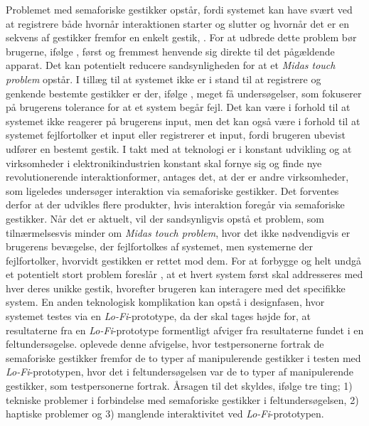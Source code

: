 Problemet med semaforiske gestikker opstår, fordi systemet kan have svært ved at registrere både hvornår interaktionen starter og slutter og hvornår det er en sekvens af gestikker fremfor en enkelt gestik, \parencite[s. 27]{PDF:ATaxonomyOfGestures}. For at udbrede dette problem bør brugerne, ifølge \textcite[s. 1]{PDF:DoThatThere}, først og fremmest henvende sig direkte til det pågældende apparat. Det kan potentielt reducere sandsynligheden for at et \textit{Midas touch problem} opstår. I tillæg til at systemet ikke er i stand til at registrere og genkende bestemte gestikker er der, ifølge \textcite[s. 37]{PDF:ATaxonomyOfGestures}, meget få undersøgelser, som fokuserer på brugerens tolerance for at et system begår fejl. Det kan være i forhold til at systemet ikke reagerer på brugerens input, men det kan også være i forhold til at systemet fejlfortolker et input eller registrerer et input, fordi brugeren ubevist udfører en bestemt gestik. \blankline
%
I takt med at teknologi er i konstant udvikling og at virksomheder i elektronikindustrien konstant skal fornye sig og finde nye revolutionerende interaktionformer, antages det, at der er andre virksomheder, som ligeledes undersøger interaktion via semaforiske gestikker. Det forventes derfor at der udvikles flere produkter, hvis interaktion foregår via semaforiske gestikker. Når det er aktuelt, vil der sandsynligvis opstå et problem, som tilnærmelsesvis minder om \textit{Midas touch problem}, hvor det ikke nødvendigvis er brugerens bevægelse, der fejlfortolkes af systemet, men systemerne der fejlfortolker, hvorvidt gestikken er rettet mod dem. For at forbygge og helt undgå et potentielt stort problem foreslår \textcite[s. 2]{PDF:DoThatThere}, at et hvert system først skal addresseres med hver deres unikke gestik, hvorefter brugeren kan interagere med det specifikke system. \blankline
%        
En anden teknologisk komplikation kan opstå i designfasen, hvor systemet testes via en \textit{Lo-Fi}-prototype, da der skal tages højde for, at resultaterne fra en \textit{Lo-Fi}-prototype formentligt afviger fra resultaterne fundet i en feltundersøgelse. \textcite[s. 176]{PDF:ComparingInputModalities} oplevede denne afvigelse, hvor testpersonerne fortrak de semaforiske gestikker fremfor de to typer af manipulerende gestikker i testen med \textit{Lo-Fi}-prototypen, hvor det i feltundersøgelsen var de to typer af manipulerende gestikker, som testpersonerne fortrak. Årsagen til det skyldes, ifølge \textcite[s. 176]{PDF:ComparingInputModalities} tre ting; 1) tekniske problemer i forbindelse med semaforiske gestikker i feltundersøgelsen, 2) haptiske problemer og 3) manglende interaktivitet ved \textit{Lo-Fi}-prototypen. 

